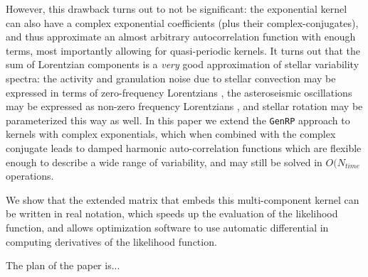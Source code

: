 \documentclass[manuscript, letterpaper]{aastex6}
\makeatletter
\let\origsection\section
\renewcommand\section{\@ifstar{\starsection}{\nostarsection}}
\newcommand\nostarsection[1]{\sectionprelude\origsection{#1}}
\newcommand\starsection[1]{\sectionprelude\origsection*{#1}}
\newcommand\sectionprelude{\vspace{1em}}
\makeatother
\begin{document}
However, this drawback turns out to not be significant:  the exponential kernel
can also have a complex exponential coefficients (plus their complex-conjugates), and 
thus approximate an almost arbitrary autocorrelation function with enough terms, most
importantly allowing for quasi-periodic kernels.  It turns out that the sum of Lorentzian 
components is a {\it very} good approximation of stellar variability spectra:  the 
activity and granulation noise due to stellar convection may be expressed in terms of zero-frequency
Lorentzians \citep{1985ESASP.235..199H}, the asteroseismic oscillations may be expressed as non-zero frequency
Lorentzians \citep{1990ApJ...364..699A,Gruberbauer2009}, and stellar rotation may be 
parameterized this way as well.  In this paper 
we extend the \texttt{GenRP} approach to kernels with complex exponentials, which when 
combined with the complex conjugate leads to damped harmonic auto-correlation functions 
which are flexible enough to describe a wide range of variability, and may still
be solved in $O(N_{time}$ operations.

We show that the extended matrix that embeds this multi-component kernel can be written
in real notation, which speeds up the evaluation of the likelihood function,
and allows optimization software to use automatic differential in computing
derivatives of the likelihood function.

The plan of the paper is...


\section{Outline}
\end{document}
